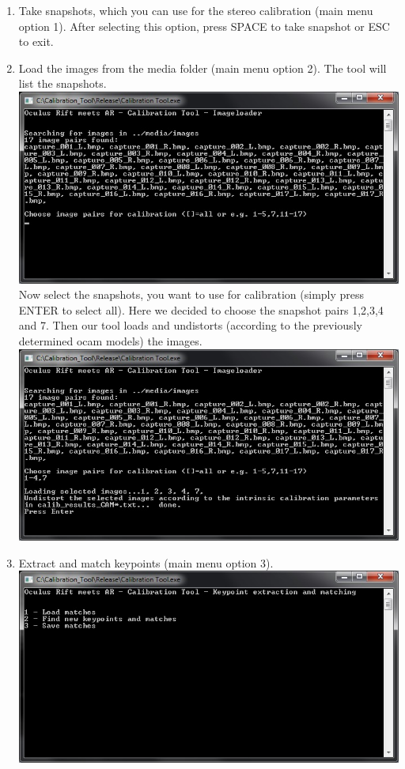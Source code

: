 \documentclass[]{article}
\begin{document}
\begin{enumerate}
\item
  Take snapshots, which you can use for the stereo calibration (main
  menu option 1). After selecting this option, press SPACE to take
  snapshot or ESC to exit.
\item
  Load the images from the media folder (main menu option 2). The tool
  will list the snapshots.\\
  \includegraphics*{2.jpg}
  Now select the snapshots, you want to use for calibration (simply
  press ENTER to select all). Here we decided to choose the snapshot
  pairs 1,2,3,4 and 7. Then our tool loads and undistorts (according to
  the previously determined ocam models) the images.\\
  \includegraphics*{3.jpg}
\item
  Extract and match keypoints (main menu option 3).\\
  \includegraphics*{4.jpg}

\end{enumerate}
\end{document}
